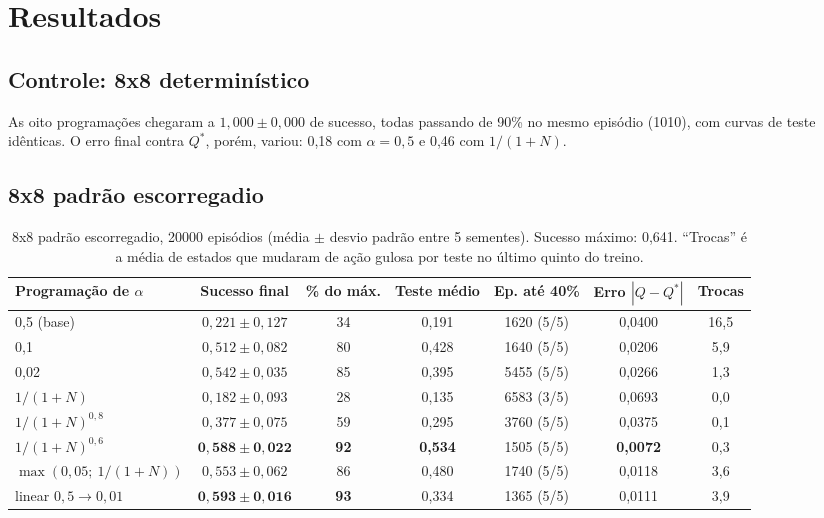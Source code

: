 \documentclass[11pt,a4paper]{article}
\begin{document}
\section{Resultados}

\subsection*{Controle: 8x8 determinístico}

As oito programações chegaram a $1{,}000 \pm 0{,}000$ de sucesso, todas passando de 90\% no mesmo episódio (1010), com
curvas de teste idênticas. O erro final contra $Q^*$, porém, variou: 0,18 com $\alpha = 0{,}5$ e 0,46 com $1/(1+N)$.

\subsection*{8x8 padrão escorregadio}

\begin{table}[H]
\centering
\footnotesize\setlength{\tabcolsep}{4pt}
\caption{8x8 padrão escorregadio, 20000 episódios (média $\pm$ desvio padrão entre 5 sementes). Sucesso máximo: 0,641.
``Trocas'' é a média de estados que mudaram de ação gulosa por teste no último quinto do treino.}
\label{tab:padrao}
\begin{tabular}{lcccccc}
\toprule
Programação de $\alpha$ & Sucesso final & \% do máx. & Teste médio & Ep. até 40\% & Erro $|Q-Q^*|$ & Trocas \\
\midrule
0,5 (base)              & $0{,}221 \pm 0{,}127$ & 34 & 0,191 & 1620 (5/5) & 0,0400 & 16,5 \\
0,1                     & $0{,}512 \pm 0{,}082$ & 80 & 0,428 & 1640 (5/5) & 0,0206 & 5,9 \\
0,02                    & $0{,}542 \pm 0{,}035$ & 85 & 0,395 & 5455 (5/5) & 0,0266 & 1,3 \\
$1/(1+N)$               & $0{,}182 \pm 0{,}093$ & 28 & 0,135 & 6583 (3/5) & 0,0693 & 0,0 \\
$1/(1+N)^{0,8}$         & $0{,}377 \pm 0{,}075$ & 59 & 0,295 & 3760 (5/5) & 0,0375 & 0,1 \\
$1/(1+N)^{0,6}$         & $\mathbf{0{,}588 \pm 0{,}022}$ & \textbf{92} & \textbf{0,534} & 1505 (5/5) & \textbf{0,0072} & 0,3 \\
$\max(0{,}05;\ 1/(1+N))$ & $0{,}553 \pm 0{,}062$ & 86 & 0,480 & 1740 (5/5) & 0,0118 & 3,6 \\
linear $0{,}5 \to 0{,}01$ & $\mathbf{0{,}593 \pm 0{,}016}$ & \textbf{93} & 0,334 & 1365 (5/5) & 0,0111 & 3,9 \\
\bottomrule
\end{tabular}
\end{table}
\end{document}
